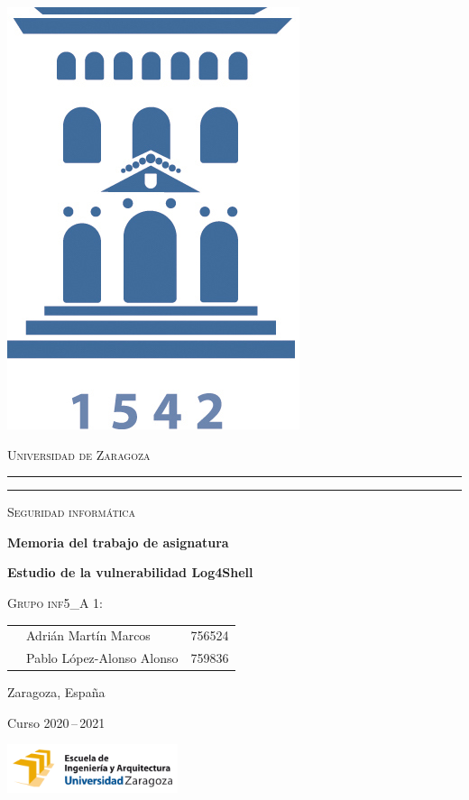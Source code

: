 \documentclass[a4paper,10pt]{article}
\begin{document}
\begin{titlepage}
    \centering
    \includegraphics[width=1 cm]{logoUZ.jpg}
    
    \textsc{\large Universidad de Zaragoza}
    \rule{\textwidth}{1.6pt}\vspace*{-\baselineskip}\vspace*{2pt} %
    \rule{\textwidth}{0.4pt} %
    
    \vfill
    
    {\LARGE \scshape Seguridad informática}
                
    \vspace{2cm}            

    {\bfseries \Huge Memoria del trabajo de asignatura}
    
    \vspace{.5cm} 
    
    {\bfseries \Large Estudio de la vulnerabilidad Log4Shell}
    
    \vspace{3cm}    
    
   

    {\scshape Grupo inf5\_A 1:}


    \vspace{0.2cm}
    
    \large
    \begin{tabular}{c l l}
    \large             & Adrián Martín Marcos       & 756524 \\
    \large             & Pablo López-Alonso Alonso       &  759836\\
     \end{tabular}

    \vfill
    
    \large{Zaragoza, España}
    
    {Curso 2020\,--\,2021}

    \vfill

    \includegraphics[width=5.0cm]{EINA.png}
   
\end{titlepage}
\end{document}
